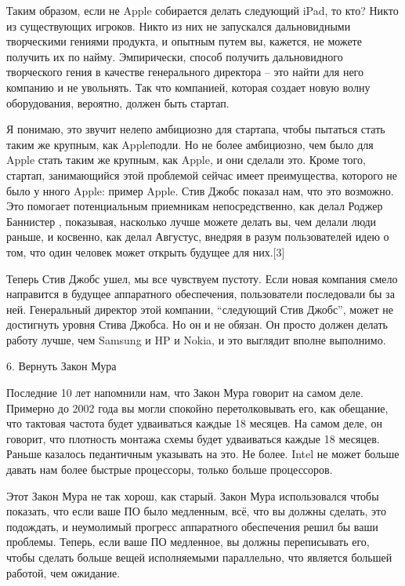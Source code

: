 \documentclass[ebook,12pt,oneside,openany]{memoir}
\begin{document}
Таким образом, если не Apple собирается делать следующий iPad, то кто?
Никто из существующих игроков. Никто из них не запускался
дальновидными творческими гениями продукта, и опытным путем вы,
кажется, не можете получить их по найму. Эмпирически, способ получить
дальновидного творческого гения в качестве генерального директора –
это найти для него компанию и не увольнять. Так что компанией, которая
создает новую волну оборудования, вероятно, должен быть стартап.

Я понимаю, это звучит нелепо амбициозно для стартапа, чтобы пытаться
стать таким же крупным, как Appleподли. Но не более амбициозно, чем
было для Apple стать таким же крупным, как Apple, и они сделали это.
Кроме того, стартап, занимающийся этой проблемой сейчас имеет
преимущества, которого не было у нного Apple: пример Apple. Стив Джобс
показал нам, что это возможно. Это помогает потенциальным приемникам
непосредственно, как делал Роджер Баннистер , показывая, насколько
лучше можете делать вы, чем делали люди раньше, и косвенно, как делал
Августус, внедряя в разум пользователей идею о том, что один человек
может открыть будущее для них.[3]

Теперь Стив Джобс ушел, мы все чувствуем пустоту. Если новая компания
смело направится в будущее аппаратного обеспечения, пользователи
последовали бы за ней. Генеральный директор этой компании, “следующий
Стив Джобс”, может не достигнуть уровня Стива Джобса. Но он и не
обязан. Он просто должен делать работу лучше, чем Samsung и HP и
Nokia, и это выглядит вполне выполнимо.

6. Вернуть Закон Мура

Последние 10 лет напомнили нам, что Закон Мура говорит на самом деле.
Примерно до 2002 года вы могли спокойно перетолковывать его, как
обещание, что тактовая частота будет удваиваться каждые 18 месяцев. На
самом деле, он говорит, что плотность монтажа схемы будет удваиваться
каждые 18 месяцев. Раньше казалось педантичным указывать на это. Не
более. Intel не может больше давать нам более быстрые процессоры,
только больше процессоров.

Этот Закон Мура не так хорош, как старый. Закон Мура использовался
чтобы показать, что если ваше ПО было медленным, всё, что вы должны
сделать, это подождать, и неумолимый прогресс аппаратного обеспечения
решил бы ваши проблемы. Теперь, если ваше ПО медленное, вы должны
переписывать его, чтобы сделать больше вещей исполняемыми параллельно,
что является большей работой, чем ожидание.
\end{document}
